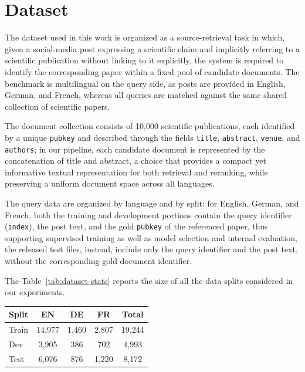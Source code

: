 \section{Dataset}
\label{sec:dataset}

The dataset used in this work is organized as a source-retrieval task in which, given a social-media post expressing a
scientific claim and implicitly referring to a scientific publication without linking to it explicitly, the system is
required to identify the corresponding paper within a fixed pool of candidate documents. The benchmark is multilingual
on the query side, as posts are provided in English, German, and French, whereas all queries are matched against the
same shared collection of scientific papers.

The document collection consists of 10,000 scientific publications, each identified by a unique \texttt{pubkey} and
described through the fields \texttt{title}, \texttt{abstract}, \texttt{venue}, and \texttt{authors}; in our pipeline,
each candidate document is represented by the concatenation of title and abstract, a choice that provides a compact yet
informative textual representation for both retrieval and reranking, while preserving a uniform document space across
all languages.

The query data are organized by language and by split: for English, German, and French, both the training and
development portions contain the query identifier (\texttt{index}), the post text, and the gold \texttt{pubkey} of the
referenced paper, thus supporting supervised training as well as model selection and internal evaluation, the released
test files, instead, include only the query identifier and the post text, without the corresponding gold document
identifier.

The Table~\ref{tab:dataset-stats} reports the size of all the data splits considered in our experiments.

\begin{center}
    \label{tab:dataset-stats}
    \begin{tabular}{lcccc}
        \toprule
        Split & EN & DE & FR & Total \\
        \midrule
        Train & 14,977 & 1,460 & 2,807 & 19,244 \\
        Dev   & 3,905  & 386   & 702   & 4,993 \\
        Test  & 6,076  & 876   & 1,220 & 8,172 \\
        \bottomrule
    \end{tabular}
\end{center}

